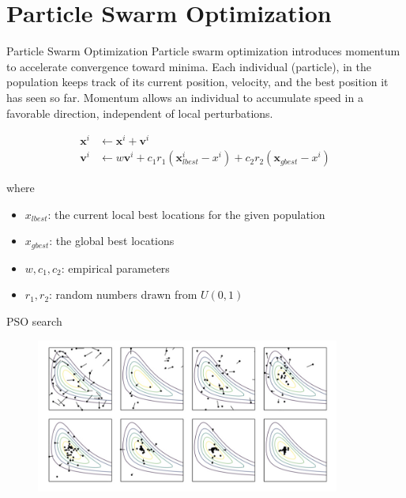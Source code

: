 \documentclass{beamer}
\begin{document}
\section{Particle Swarm Optimization}
\begin{frame}{Particle Swarm Optimization}
Particle swarm optimization introduces momentum to accelerate convergence toward minima. Each individual (particle), in the population keeps track of its current position, velocity, and the best position it has seen so far. Momentum allows an individual to accumulate speed in a favorable direction, independent of local perturbations.

\begin{equation*}
\begin{split}
    \boldsymbol{x}^i & \leftarrow \boldsymbol{x}^i + \boldsymbol{v}^i \\
    \boldsymbol{v}^i & \leftarrow w\boldsymbol{v}^i + c_1 r_1 (\boldsymbol{x}_{lbest}^i - x^i) + c_2 r_2(\boldsymbol{x}_{gbest} - x^i)
\end{split}
\end{equation*}

where 
\begin{itemize}
    \item $x_{lbest}$: the current local best locations for the given population
    \item $x_{gbest}$: the global best locations
    \item $w, c_1, c_2$: empirical parameters
    \item $r_1, r_2$: random numbers drawn from $U(0, 1)$
\end{itemize}

\end{frame}

\begin{frame}{PSO search}
\begin{figure}
\centering
\includegraphics[width=100mm]{Figs/pso.jpeg}
\end{figure}   
\end{frame}
\end{document}
